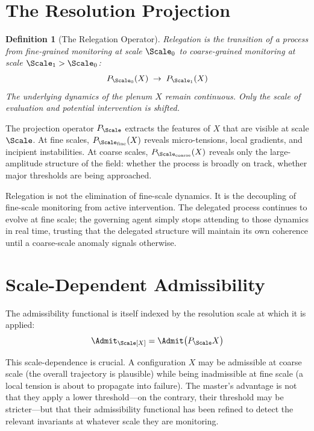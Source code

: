 \documentclass[11pt,oneside]{book}
\newtheorem{definition}{Definition}[chapter]
\begin{document}
\section{The Resolution Projection}

\begin{definition}[The Relegation Operator]
\emph{Relegation} is the transition of a process from fine-grained monitoring at scale $\Scale_0$ to coarse-grained monitoring at scale $\Scale_1 > \Scale_0$:
\begin{equation}
    P_{\Scale_0}(X) \;\rightarrow\; P_{\Scale_1}(X)
\end{equation}
The underlying dynamics of the plenum $X$ remain continuous. Only the scale of evaluation and potential intervention is shifted.
\end{definition}

The projection operator $P_\Scale$ extracts the features of $X$ that are visible at scale $\Scale$. At fine scales, $P_{\Scale_{\mathrm{fine}}}(X)$ reveals micro-tensions, local gradients, and incipient instabilities. At coarse scales, $P_{\Scale_{\mathrm{coarse}}}(X)$ reveals only the large-amplitude structure of the field: whether the process is broadly on track, whether major thresholds are being approached.

Relegation is not the elimination of fine-scale dynamics. It is the decoupling of fine-scale monitoring from active intervention. The delegated process continues to evolve at fine scale; the governing agent simply stops attending to those dynamics in real time, trusting that the delegated structure will maintain its own coherence until a coarse-scale anomaly signals otherwise.

\section{Scale-Dependent Admissibility}

The admissibility functional is itself indexed by the resolution scale at which it is applied:
\begin{equation}
    \Admit_\Scale[X] = \Admit\bigl(P_\Scale X\bigr)
\end{equation}

This scale-dependence is crucial. A configuration $X$ may be admissible at coarse scale (the overall trajectory is plausible) while being inadmissible at fine scale (a local tension is about to propagate into failure). The master's advantage is not that they apply a lower threshold---on the contrary, their threshold may be stricter---but that their admissibility functional has been refined to detect the relevant invariants at whatever scale they are monitoring.
\end{document}
